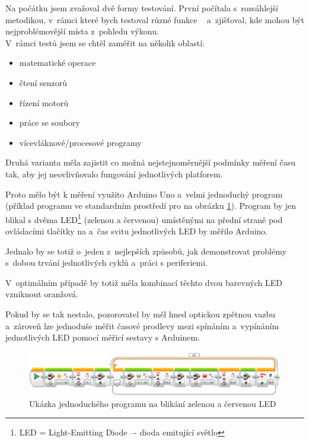 Na počátku jsem zvažoval dvě formy testování. První počítala s~rozsáhlejší metodikou, v~rámci které bych testoval různé funkce \EVthree{}~ a~zjišťoval, kde mohou být nejproblémovější místa z~pohledu výkonu. \\

V~rámci testů jsem se chtěl zaměřit na několik oblastí: %

\begin{itemize}
	\item matematické operace
	\item čtení senzorů
	\item řízení motorů
	\item práce se soubory
	\item vícevláknové/procesové programy
\end{itemize}  

Druhá varianta měla zajistit co možná nejstejnoměrnější podmínky měření času tak, aby jej neovlivňovalo fungování jednotlivých platforem. 

Proto mělo být k měření využito Arduino Uno a~velmi jednoduchý program  (příklad programu ve standardním prostředí pro \EVthree{ }na obrázku \ref{fig:LoopTimeLEDblinking-measuring}).
Program by jen blikal s dvěma LED\footnote{LED = Light-Emitting Diode –- dioda emitující světlo} (zelenou a červenou) umístěnými na přední straně pod ovládacími tlačítky na  a~čas svitu jednotlivých LED by měřilo Arduino.




Jednalo by se totiž o~jeden z~nejlepších způsobů, jak demonstrovat problémy s~dobou trvání jednotlivých cyklů a~práci s periferiemi. 

V~optimálním případě by totiž měla kombinací těchto dvou barevných LED vzniknout oranžová. 

Pokud by se tak nestalo, pozorovatel by měl hned optickou zpětnou vazbu a~zároveň lze jednoduše měřit časové prodlevy mezi spínáním a~vypínáním jednotlivých LED pomocí měřicí sestavy s Arduinem.


\begin{figure}[h]
	\centering
	\includegraphics[width=\textwidth]{images/measuring-ev3-software_LoopTimeLEDblinking.png}
	\caption[Ukázka jednoduchého programu na blikání zelenou a červenou LED]{Ukázka jednoduchého programu na blikání zelenou a červenou LED}
	\label{fig:LoopTimeLEDblinking-measuring}
\end{figure}


